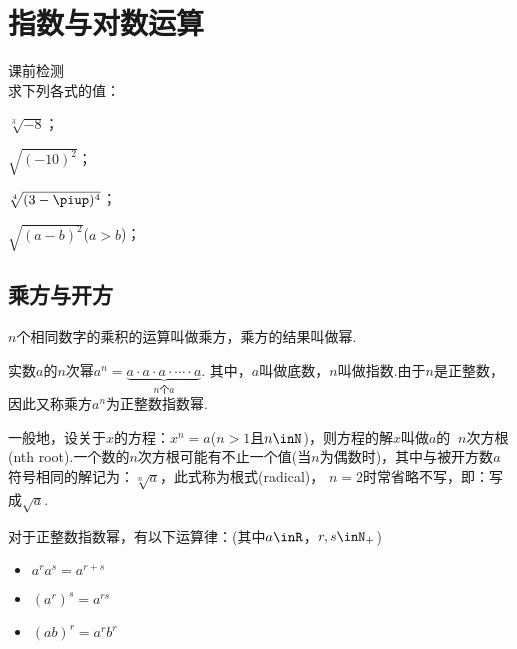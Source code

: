 \section{指数与对数运算}
  \begin{exercise}{\heiti 课前检测}\\
    求下列各式的值：
    \begin{enumerate}[label=\arabic*)]
      \begin{multicols}{2}
        \item $\sqrt[3]{-8}$；
        \item $\sqrt{(-10)^2}$；
        \item $\sqrt[4]{(3-\piup)^4}$；
        \item $\sqrt{(a-b)^2}$\quad($a>b$)；
      \end{multicols}
    \end{enumerate}
  \end{exercise}
  \subsection{乘方与开方}
    \begin{description}[leftmargin=0pt]
      \item [乘方] $n$个相同数字的乘积的运算叫做{\FDef 乘方}，乘方的结果叫做{\FDef 幂}. \par
        实数$a$的$n$次幂$a^n=\underbrace{{a\cdot a\cdot a\cdot \cdots \cdot a}}_{n\text{个}a}$.
        其中，$a$叫做{\FDef 底数}，$n$叫做{\FDef 指数}.由于$n$是正整数，因此又称乘方$a^n$为{\FDef 正整数指数幂}.
      \\
      \item [$n$次方根与根式]
        一般地，设关于$x$的方程：$x^n=a$($n>1$且$n\inN$)，则方程的解$x$叫做$a$的 {\FDef $~n$次方根}(nth root).一个数的$n$次方根可能有不止一个值(当$n$为偶数时)，其中与{\FDef 被开方数}$a$符号相同的解记为：$\sqrt[n]a$，此式称为{\FDef 根式}(radical)，
        $n=2$时常省略不写，即：写成$\sqrt a$.
        \\
      \item [运算性质]对于正整数指数幂，有以下运算律：(其中$a\inR$，$r,s\inN_+$)
        \begin{itemize}%
          \item $a^ra^s=a^{r+s}$
          \item $(a^r)^s=a^{rs}$
          \item $(ab)^r=a^rb^r$
        \end{itemize}
    \end{description}
